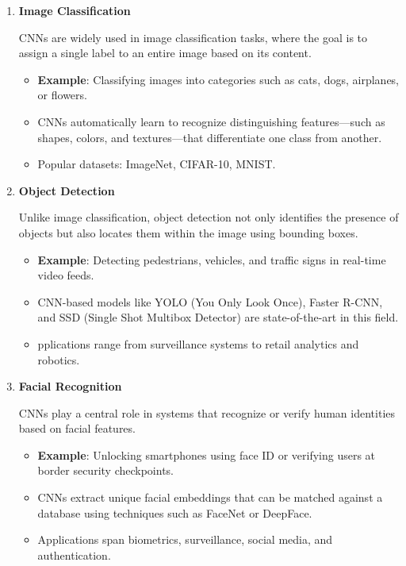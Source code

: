 \begin{enumerate}
    \item \textbf{Image Classification}
    
    CNNs are widely used in image classification tasks, where the goal is to assign a single label to an entire image based on its content.
    \begin{itemize}
    
        \item \textbf{Example}: Classifying images into categories such as cats, dogs, airplanes, or flowers.
        \item CNNs automatically learn to recognize distinguishing features—such as shapes, colors, and textures—that differentiate one class from another.
        \item Popular datasets: ImageNet, CIFAR-10, MNIST.
        
    \end{itemize}
    
    \item \textbf{Object Detection}
    
    Unlike image classification, object detection not only identifies the presence of objects but also locates them within the image using bounding boxes.
    
    \begin{itemize}
        \item \textbf{Example}: Detecting pedestrians, vehicles, and traffic signs in real-time video feeds.
        \item CNN-based models like YOLO (You Only Look Once), Faster R-CNN, and SSD (Single Shot Multibox Detector) are state-of-the-art in this field.
        \item pplications range from surveillance systems to retail analytics and robotics.




    \end{itemize}
    
    \item \textbf{Facial Recognition}
    
    CNNs play a central role in systems that recognize or verify human identities based on facial features.
    \begin{itemize}
        \item \textbf{Example}: Unlocking smartphones using face ID or verifying users at border security checkpoints.
        \item CNNs extract unique facial embeddings that can be matched against a database using techniques such as FaceNet or DeepFace.
        \item Applications span biometrics, surveillance, social media, and authentication.





\end{itemize}
\end{enumerate}

